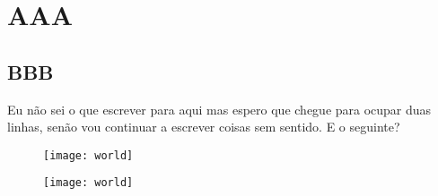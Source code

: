 \documentclass[11pt]{article}
\begin{document}
\section{AAA}
\subsection{BBB}
Eu não sei o que escrever para aqui mas espero que chegue para ocupar duas linhas, senão vou continuar a escrever coisas sem sentido.
E o seguinte?

\begin{figure}[htbp]
\centering
\begin{minipage}{.5\textwidth}
	\centering
	\texttt{[image: world]}
	\label{fig:fig1}
\end{minipage}%
\begin{minipage}{.5\textwidth}
	\centering
	\texttt{[image: world]}
	\label{fig:fig2}
\end{minipage}
\end{figure}
\end{document}
